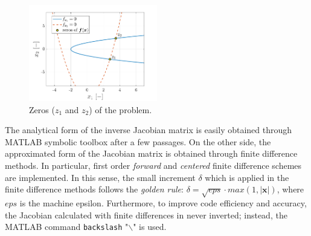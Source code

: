 \documentclass[11pt,a4paper,oneside]{article}
\renewcommand{\vec}[1]{\mathbf{#1}}
\begin{document}
\begin{figure}
\centering
\vspace{-0.3cm}
    \includegraphics[width = 0.5\textwidth]{gfx/ex1_3.pdf}
    \caption{Zeros ($z_1$ and $z_2$) of the problem.}
    \label{fig:ex1_solution}
\end{figure}
The analytical form of the inverse Jacobian matrix is easily obtained through MATLAB symbolic toolbox after a few passages. On the other side, the approximated form of the Jacobian matrix is obtained through finite difference methods. In particular, first order \textit{forward} and \textit{centered} finite difference schemes are implemented. In this sense, the small increment $\delta$ which is applied in the finite difference methods follows the \textit{golden rule}: $\delta=\sqrt{eps}\cdot max(1, |\vec{x}|)$, where $eps$ is the machine epsilon. Furthermore, to improve code efficiency and accuracy, the Jacobian calculated with finite differences in never inverted; instead, the MATLAB command \texttt{backslash} "$\backslash$" is used.
\end{document}
